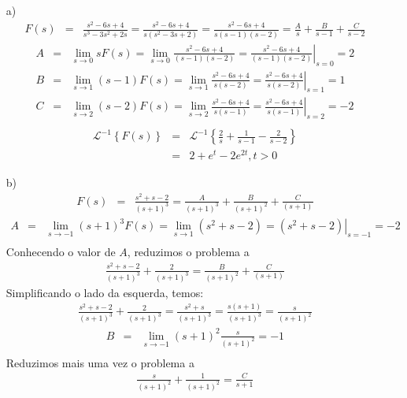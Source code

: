 \begin{resp}
\begin{itemize}
 \item [a)]
 \begin{eqnarray*}
F(s)&=&\frac{s^2-6s+4}{s^3-3s^2+2s}=\frac{s^2-6s+4}{s(s^2-3s+2)}=\frac{s^2-6s+4}{s(s-1)(s-2)}=\frac{A}{s}+\frac{B}{s-1}+\frac{C}{s-2}
\end{eqnarray*}
\begin{eqnarray*}
A&=&\lim_{s\to 0}sF(s)=\lim_{s\to 0}\frac{s^2-6s+4}{(s-1)(s-2)}=\left.\frac{s^2-6s+4}{(s-1)(s-2)}\right|_{s=0}=2\\
B&=&\lim_{s\to 1}(s-1)F(s)=\lim_{s\to 1}\frac{s^2-6s+4}{s(s-2)}=\left.\frac{s^2-6s+4}{s(s-2)}\right|_{s=1}=1\\
C&=&\lim_{s\to 2}(s-2)F(s)=\lim_{s\to 2}\frac{s^2-6s+4}{s(s-1)}=\left.\frac{s^2-6s+4}{s(s-1)}\right|_{s=2}=-2\\
\end{eqnarray*}
\begin{eqnarray*}
\mathcal{L}^{-1}\left\{F(s)\right\}&=&\mathcal{L}^{-1}\left\{\frac{2}{s}+\frac{1}{s-1}-\frac{2}{s-2}\right\}\\
&=&2+e^{t}-2e^{2t},t>0
\end{eqnarray*}
 \item [b)]
\begin{eqnarray*}
F(s)&=&\frac{s^2+s-2}{(s+1)^3}=\frac{A}{(s+1)^3}+\frac{B}{(s+1)^2}+\frac{C}{(s+1)}
\end{eqnarray*}
\begin{eqnarray*}
A&=&\lim_{s\to -1}(s+1)^3F(s)=\lim_{s\to 1}(s^2+s-2)=\left.(s^2+s-2)\right|_{s=-1}=-2\\
\end{eqnarray*}
Conhecendo o valor de $A$, reduzimos o problema a
\begin{eqnarray*}
\frac{s^2+s-2}{(s+1)^3}+\frac{2}{(s+1)^3}=\frac{B}{(s+1)^2}+\frac{C}{(s+1)}
\end{eqnarray*}
Simplificando o lado da esquerda, temos:
\begin{eqnarray*}
\frac{s^2+s-2}{(s+1)^3}+\frac{2}{(s+1)^3}=\frac{s^2+s}{(s+1)^3}=\frac{s(s+1)}{(s+1)^3}=\frac{s}{(s+1)^2}
\end{eqnarray*}
\begin{eqnarray*}
B&=&\lim_{s\to -1}(s+1)^2\frac{s}{(s+1)^2}=-1\\
\end{eqnarray*}
Reduzimos mais uma vez o problema a
\begin{eqnarray*}
\frac{s}{(s+1)^2}+\frac{1}{(s+1)^2}=\frac{C}{s+1}

\end{eqnarray*}
\end{itemize}
\end{resp}
